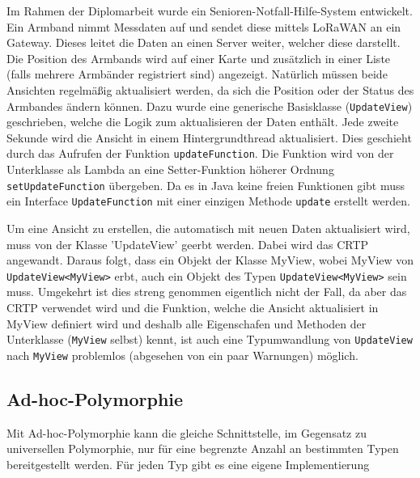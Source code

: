 					Im Rahmen der Diplomarbeit wurde ein Senioren-Notfall-Hilfe-System entwickelt. Ein Armband nimmt Messdaten
					auf und sendet diese mittels LoRaWAN an ein Gateway. Dieses leitet die Daten an einen Server weiter,
					welcher diese darstellt. Die Position des Armbands wird auf einer Karte und zusätzlich in einer Liste
					(falls mehrere Armbänder registriert sind) angezeigt. Natürlich müssen beide Ansichten regelmäßig
					aktualisiert werden, da sich die Position oder der Status des Armbandes ändern können. Dazu wurde eine
					generische Basisklasse (\lstinline|UpdateView|) geschrieben, welche die Logik zum aktualisieren der Daten enthält. Jede
					zweite Sekunde wird die Ansicht in einem Hintergrundthread aktualisiert. Dies geschieht durch das Aufrufen
					der Funktion \lstinline|updateFunction|. Die Funktion wird von der Unterklasse als Lambda an eine Setter-Funktion
					höherer Ordnung \lstinline|setUpdateFunction| übergeben. Da es in Java keine freien Funktionen gibt muss ein
					Interface \lstinline|UpdateFunction| mit einer einzigen Methode \lstinline|update| erstellt werden.
					
					\UseRawInputEncoding{}
					
					Um eine Ansicht zu erstellen, die automatisch mit neuen Daten aktualisiert wird, muss von der Klasse
					'UpdateView' geerbt werden. Dabei wird das CRTP angewandt. Daraus folgt, dass ein Objekt der Klasse
					MyView, wobei MyView von \lstinline|UpdateView<MyView>| erbt, auch ein Objekt des Typen \lstinline|UpdateView<MyView>| sein
					muss. Umgekehrt ist dies streng genommen eigentlich nicht der Fall, da aber das CRTP verwendet wird und die
					Funktion, welche die Ansicht aktualisiert in MyView definiert wird und deshalb alle Eigenschafen und
					Methoden der Unterklasse (\lstinline|MyView| selbst) kennt, ist auch eine Typumwandlung von \lstinline|UpdateView| nach \lstinline|MyView|
					problemlos (abgesehen von ein paar Warnungen) möglich.
					
					\UseRawInputEncoding{}
					
					\UseRawInputEncoding{}
					
	\subsection{Ad-hoc-Polymorphie}
		Mit Ad-hoc-Polymorphie kann die gleiche Schnittstelle, im Gegensatz zu universellen Polymorphie, nur für eine
		begrenzte Anzahl an bestimmten Typen bereitgestellt werden. Für jeden Typ gibt es eine eigene Implementierung
	
